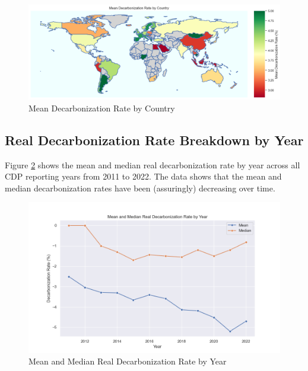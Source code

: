 \begin{figure}[htbp]
    \begin{center}
    \includegraphics[width=5in]{figures/mean_decarbonization_rate_country.png}
    \caption{Mean Decarbonization Rate by Country}
    \label{fig:mean-decarbonization-rate-by-country}
    \end{center}
\end{figure}




\subsection{Real Decarbonization Rate Breakdown by Year}

Figure \ref{fig:mean-decarbonization-rate-by-year} shows the mean and median real decarbonization rate by year across all CDP reporting years from 2011 to 2022. The data shows that the mean and median decarbonization rates have been (assuringly) decreasing over time.

\begin{figure}[H]
    \begin{center}
    \includegraphics[width=5in]{figures/mean_decarbonization_rate_year.png}
    \caption{Mean and Median Real Decarbonization Rate by Year}
    \label{fig:mean-decarbonization-rate-by-year}
    \end{center}
\end{figure}

